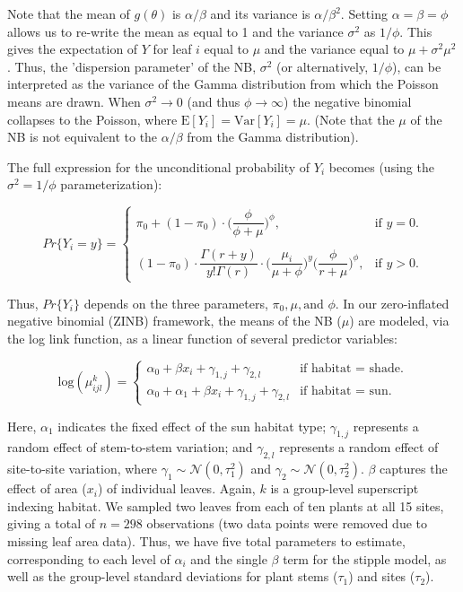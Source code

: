 \documentclass[11pt, oneside]{amsart}
\begin{document}
Note that the mean of $g(\theta)$ is $\alpha / \beta$ and its variance is $\alpha/\beta^{2}$. Setting $\alpha = \beta = \phi$ allows us to re-write the mean as equal to 1 and the variance $\sigma^2$ as $1/\phi$. This gives the expectation of $Y$ for leaf $i$ equal to $\mu$ and the variance equal to $\mu + \sigma^2 \mu^2$. Thus, the 'dispersion parameter' of the NB, $\sigma^2$ (or alternatively, $1/\phi$), can be interpreted as the variance of the Gamma distribution from which the Poisson means are drawn. When $\sigma^2 \rightarrow 0$ (and thus $\phi \rightarrow \infty$) the negative binomial collapses to the Poisson, where $\text{E}[Y_i] = \text{Var}[Y_i] = \mu$. (Note that the $\mu$ of the NB is not equivalent to the $\alpha/\beta$ from the Gamma distribution).

The full expression for the unconditional probability of $Y_i$ becomes (using the $\sigma^2 = 1/\phi$ parameterization):

\begin{equation}
Pr\Big \{Y_i = y \Big \} = \begin{cases}
	\pi_{0} + (1 - \pi_{0}) \cdot \Bigg ( \dfrac{\phi}{\phi + \mu}\Bigg )^\phi, & \text{if } y = 0.\\
	\\
    (1-\pi_{0}) \cdot \dfrac{\Gamma(r + y)}{y!\Gamma(r)} \cdot \Bigg ( \dfrac{\mu_i}{\mu + \phi}\Bigg )^{y} \Bigg ( \dfrac{\phi}{r + \mu}\Bigg )^\phi, & \text{if } y > 0.
	\end{cases}
\end{equation}

Thus, $Pr\{Y_i\}$ depends on the three parameters, $\pi_{0}, \mu, \text{and } \phi$. In our zero-inflated negative binomial (ZINB) framework, the means of the NB ($\mu$) are modeled, via the log link function, as a linear function of several predictor variables:

\begin{equation}
\text{log}(\mu^{k}_{ijl}) = \begin{cases}
\alpha_0 + \beta x_i + \gamma_{1,j} + \gamma_{2,l} & \text{if habitat = shade}.\\
    \alpha_0 + \alpha_1 + \beta x_i + \gamma_{1,j} + \gamma_{2,l} & \text{if habitat = sun}.
  \end{cases}
\end{equation}

Here, $\alpha_1$ indicates the fixed effect of the sun habitat type; $\gamma_{1,j}$ represents a random effect of stem-to-stem variation; and $\gamma_{2,l}$ represents a random effect of site-to-site variation, where $\gamma_1 \sim \mathcal{N}(0,\tau^2_{1})$ and $\gamma_2 \sim \mathcal{N}(0,\tau^2_{2})$. $\beta$ captures the effect of area ($x_i$) of individual leaves. Again, $k$ is a group-level superscript indexing habitat. We sampled two leaves from each of ten plants at all 15 sites, giving a total of $n=298$ observations (two data points were removed due to missing leaf area data). Thus, we have five total parameters to estimate, corresponding to each level of $\alpha_i$ and the single $\beta$ term for the stipple model, as well as the group-level standard deviations for plant stems ($\tau_1$) and sites ($\tau_2$).
\end{document}
